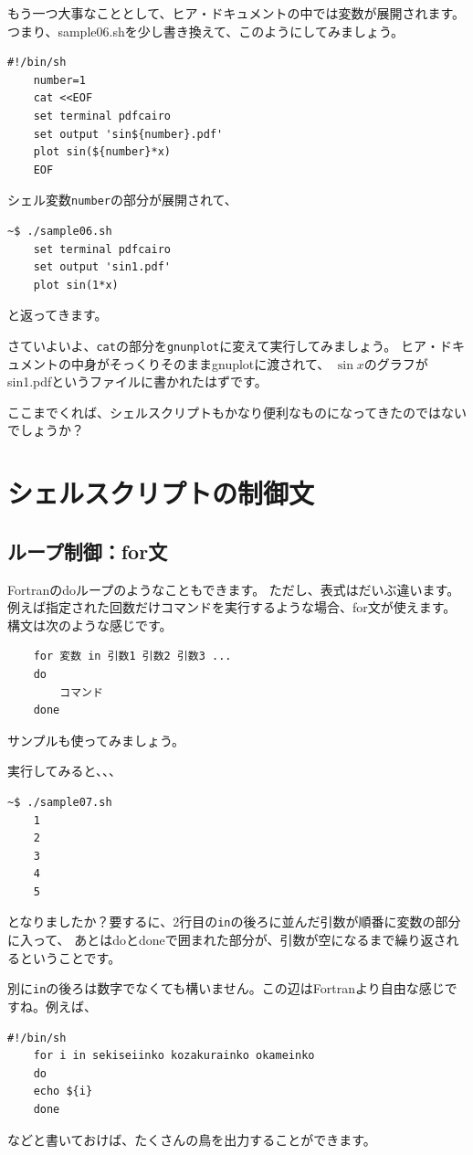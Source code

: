 \documentclass[a4j]{ltjsreport}
\begin{document}
    もう一つ大事なこととして、ヒア・ドキュメントの中では変数が展開されます。
    つまり、sample06.shを少し書き換えて、このようにしてみましょう。
    \begin{lstlisting}[caption=sample06.sh 改]
    #!/bin/sh
    number=1
    cat <<EOF
    set terminal pdfcairo
    set output 'sin${number}.pdf'
    plot sin(${number}*x)
    EOF
    \end{lstlisting}
    シェル変数\texttt{number}の部分が展開されて、
    \begin{lstlisting}[numbers=none]
    ~$ ./sample06.sh 
    set terminal pdfcairo
    set output 'sin1.pdf'
    plot sin(1*x)
    \end{lstlisting}
    と返ってきます。

    さていよいよ、\texttt{cat}の部分を\texttt{gnunplot}に変えて実行してみましょう。
    ヒア・ドキュメントの中身がそっくりそのままgnuplotに渡されて、
    $\sin x$のグラフがsin1.pdfというファイルに書かれたはずです。

    ここまでくれば、シェルスクリプトもかなり便利なものになってきたのではないでしょうか？

    \section{シェルスクリプトの制御文}

    \subsection{ループ制御：for文}
    Fortranのdoループのようなこともできます。
    ただし、表式はだいぶ違います。
    例えば指定された回数だけコマンドを実行するような場合、for文が使えます。
    構文は次のような感じです。
    \begin{lstlisting}
    for 変数 in 引数1 引数2 引数3 ...
    do
        コマンド
    done
    \end{lstlisting}
    サンプルも使ってみましょう。
    
    実行してみると、、、
    \begin{lstlisting}[numbers=none]
    ~$ ./sample07.sh 
    1
    2
    3
    4
    5
    \end{lstlisting}
    となりましたか？要するに、2行目の\texttt{in}の後ろに並んだ引数が順番に変数の部分に入って、
    あとはdoとdoneで囲まれた部分が、引数が空になるまで繰り返されるということです。

    別に\texttt{in}の後ろは数字でなくても構いません。この辺はFortranより自由な感じですね。例えば、
    \begin{lstlisting}[caption=sample07.sh 改]
    #!/bin/sh
    for i in sekiseiinko kozakurainko okameinko
    do
    echo ${i}
    done
    \end{lstlisting}
    などと書いておけば、たくさんの鳥を出力することができます。
\end{document}
